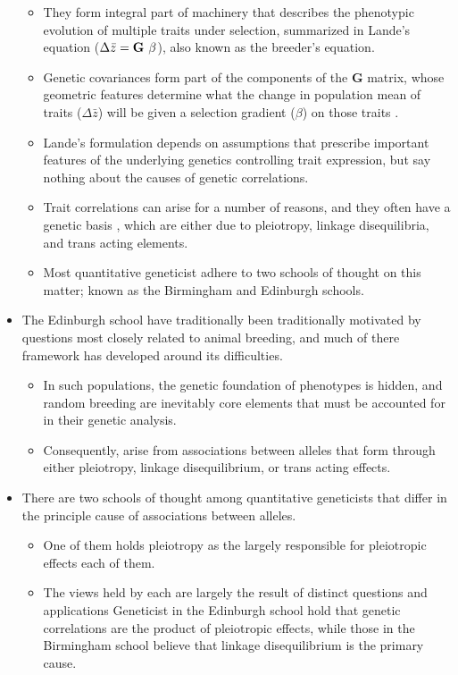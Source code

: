 \documentclass[12pt,one column]{article}
\begin{document}
\begin{itemize}
	\begin{itemize}
	\item They form integral part of machinery that describes the phenotypic evolution of multiple traits under selection, summarized in Lande's equation ($\Delta \bar{z} = \textbf{G} \hspace{.05in}\beta$), also known as the breeder's equation. 
	\item Genetic covariances form part of the components of the \textbf{G} matrix, whose geometric features determine what the change in population mean of traits ($\Delta \bar{z}$) will be given a selection gradient ($\beta$) on those traits \cite{Arnold2008}.
	\item Lande’s formulation depends on assumptions that prescribe important features of the underlying genetics controlling trait expression, but say nothing about the causes of genetic correlations.
	\item Trait correlations can arise for a number of reasons, and they often have a genetic basis \cite{Saltz2017}, which are either due to pleiotropy, linkage disequilibria, and trans acting elements.
	\item Most quantitative geneticist adhere to two schools of thought on this matter; known as the Birmingham and Edinburgh schools.
	\end{itemize}
\item The Edinburgh school have traditionally been traditionally motivated by questions most closely related to animal breeding, and much of there framework has developed around its difficulties. 
	\begin{itemize} 
	\item In such populations, the genetic foundation of phenotypes is hidden, and random breeding are inevitably core elements that must be accounted for in their genetic analysis.  
	\item Consequently, arise from associations between alleles that form through either pleiotropy, linkage disequilibrium, or trans acting effects.
	\end{itemize}
\item There are two schools of thought among quantitative geneticists that differ in the principle cause of associations between alleles.  
	\begin{itemize}
	\item One of them holds pleiotropy as the largely responsible for  pleiotropic effects each of them. 
	\item The views held by each are largely the result of distinct questions and applications Geneticist in the Edinburgh school hold that genetic correlations are the product of pleiotropic effects, while those in the Birmingham school believe that linkage disequilibrium is the primary cause.

\end{itemize}
\end{itemize}
\end{document}
